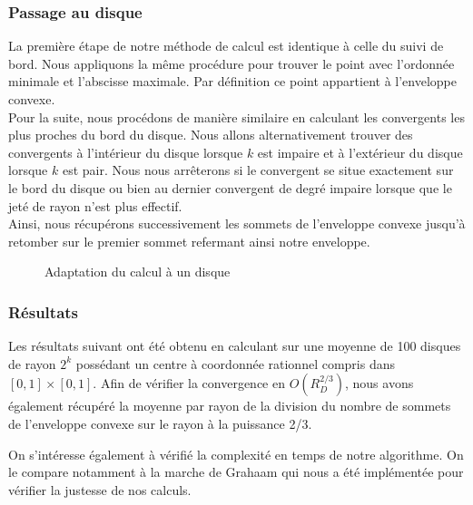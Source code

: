 
\subsubsection{Passage au disque}

La première étape de notre méthode de calcul est identique à celle du suivi de bord. Nous appliquons la même procédure pour trouver le point avec l'ordonnée minimale et l'abscisse maximale. Par définition ce point appartient à l'enveloppe convexe.\\

Pour la suite, nous procédons de manière similaire en calculant les convergents les plus proches du bord du disque. Nous allons alternativement trouver des convergents à l'intérieur du disque lorsque $k$ est impaire et à l'extérieur du disque lorsque $k$ est pair. Nous nous arrêterons si le convergent se situe exactement sur le bord du disque ou bien au dernier convergent de degré impaire lorsque que le jeté de rayon n'est plus effectif.\\

Ainsi, nous récupérons successivement les sommets de l'enveloppe convexe jusqu'à retomber sur le premier sommet refermant ainsi notre enveloppe.

\begin{figure}[H]
  \centering
  \caption{Adaptation du calcul à un disque}
\end{figure}

\subsubsection{Résultats}

Les résultats suivant ont été obtenu en calculant sur une moyenne de 100 disques de rayon $2^k$ possédant un centre à coordonnée rationnel compris dans $[0,1]\times[0,1]$. Afin de vérifier la convergence en $O(R_{D}^{2/3})$, nous avons également récupéré la moyenne par rayon de la division du nombre de sommets de l'enveloppe convexe sur le rayon à la puissance 2/3.

On s'intéresse également à vérifié la complexité en temps de notre algorithme. On le compare notamment à la marche de Grahaam qui nous a été implémentée pour vérifier la justesse de nos calculs. 

